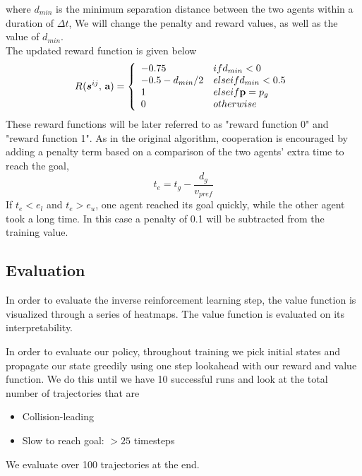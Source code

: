 \documentclass[conference]{IEEEtran}
\begin{document}
where $d_{min}$ is the minimum separation distance between
the two agents within a duration of $\Delta t$,
We will change the penalty and reward values, as well as the value of $d_{min}$.\\
The updated reward function is given below
\begin{equation} 
\Reward{}(\state{ij}{}, \, \textbf{a})=
\left\{
    \begin{array}{ll}
        -0.75 & \mbox{if } d_{min}<0  \\
        -0.5 - d_{min}/2 & \mbox{else if } d_{min}<0.5\\
        1 & \mbox{else if }  \textbf{p}=p_{g} \\
        0 & \mbox{otherwise }\\
    \end{array}
\right. 
\label{eqn:reward2}
\end{equation}
These reward functions will be later referred to as "reward function 0" and "reward function 1". 
As in the original algorithm, cooperation is encouraged by adding a penalty term based on a comparison of the two agents’ extra time to reach the goal,
\begin{equation} 
t_{e} = t_{g}- \frac{d_{g}}{v_{pref}} 
\end{equation}
If $t_{e} < e_{l}$ and $t_{e} > e_{u}$, one agent reached its goal quickly, while the other agent took a long time. In this case a penalty of 0.1 will be subtracted from
the training value. 

\subsection{Evaluation}

In order to evaluate the inverse reinforcement learning step, the value function is visualized through a series of heatmaps. The value function is evaluated on its interpretability. 

In order to evaluate our policy, throughout training we pick initial states and propagate our state greedily using one step lookahead with our reward and value function. We do this until we have 10 successful runs and look at the total number of trajectories that are

\begin{itemize}
    \item Collision-leading
    \item Slow to reach goal: $>25$ timesteps
\end{itemize}
We evaluate over 100 trajectories at the end. 
\end{document}
